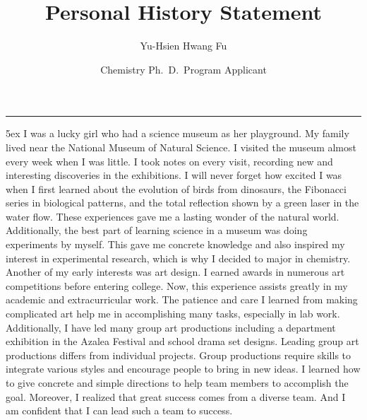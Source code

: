 \documentclass[a4paper, 12pt]{article}
\title{Personal History Statement}
\author{Yu-Hsien Hwang Fu}
\date {Chemistry Ph.~D.~Program Applicant }
\makeatletter
\newcommand{\HRule}{\rule{\linewidth}{0.2mm}}
\renewcommand{\maketitle}{
  \parindent=0pt%
  \begin{flushleft}
  {\bf \large\@author} \hfill \vspace*{-0.1in} {\small \@date}
   \HRule
  \end{flushleft}
  \begin{center}
      \MakeUppercase{\bf \@title}
  \end{center}%
    \par
}
\makeatother
\begin{document}
\maketitle

\parindent 5ex
\pagestyle{empty}
%
%
I was a lucky girl who had a science museum as her playground. My family lived near the National Museum of Natural Science. I visited the museum almost every week when I was little. I took notes on every visit, recording new and interesting discoveries in the exhibitions. I will never forget how excited I was when I first learned about the evolution of birds from dinosaurs, the Fibonacci series in biological patterns, and the total reflection shown by a green laser in the water flow. These experiences gave me a lasting wonder of the natural world. Additionally, the best part of learning science in a museum was doing experiments by myself. This gave me concrete knowledge and also inspired my interest in experimental research, which is why I decided to major in chemistry.\\
 
\vspace*{-1.2ex} 
Another of my early interests was art design. I earned awards in numerous art competitions before entering college. Now, this experience assists greatly in my academic and extracurricular work. The patience and care I learned from making complicated art help me in accomplishing many tasks, especially in lab work.  Additionally, I have led many group art productions including a department exhibition in the Azalea Festival and school drama set designs. Leading group art productions differs from individual projects. Group productions require skills to integrate various styles and encourage people to bring in new ideas. I learned how to give concrete and simple directions to help team members to accomplish the goal. Moreover, I realized that great success comes from a diverse team. And I am confident that I can lead such a team to success.\\
\end{document}

